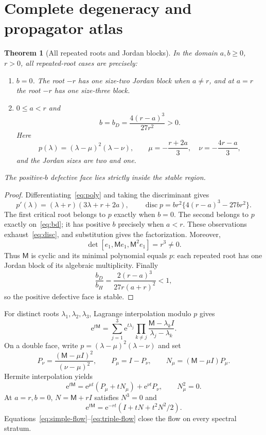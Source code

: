 \documentclass[9pt]{extarticle}
\newtheorem{theorem}{Theorem}
\newcommand{\ee}{\mathrm e}
\newcommand{\M}{\mathsf M}
\begin{document}
\section{Complete degeneracy and propagator atlas}

\begin{theorem}[All repeated roots and Jordan blocks]\label{thm:jordan}
In the domain $a,b\geq0$, $r>0$, all repeated-root cases are precisely:
\begin{enumerate}
\item $b=0$.  The root $-r$ has one size-two Jordan block when $a\ne r$,
and at $a=r$ the root $-r$ has one size-three block.
\item $0\leq a<r$ and
\begin{equation}\label{eq:bd}
 b=b_D=\frac{4(r-a)^3}{27r^2}>0.
\end{equation}
Here
\[
 p(\lambda)=(\lambda-\mu)^2(\lambda-\nu),\qquad
 \mu=-\frac{r+2a}{3},\quad \nu=-\frac{4r-a}{3},
\]
and the Jordan sizes are two and one.
\end{enumerate}
The positive-$b$ defective face lies strictly inside the stable region.
\end{theorem}

\begin{proof}
Differentiating~\eqref{eq:poly} and taking the discriminant gives
\begin{equation}\label{eq:disc}
 p'(\lambda)=(\lambda+r)(3\lambda+r+2a),\qquad
 \operatorname{disc}p=br^2\{4(r-a)^3-27br^2\}.
\end{equation}
The first critical root belongs to $p$ exactly when $b=0$.  The second
belongs to $p$ exactly on~\eqref{eq:bd}; it has positive $b$ precisely when
$a<r$.  These observations exhaust~\eqref{eq:disc}, and substitution gives
the factorization.  Moreover,
\[
 \det[e_1,\M e_1,\M^2e_1]=r^3\ne0.
\]
Thus $\M$ is cyclic and its minimal polynomial equals $p$: each repeated
root has one Jordan block of its algebraic multiplicity.  Finally
\[
 \frac{b_D}{b_H}
 =\frac{2(r-a)^3}{27r(a+r)^2}<1,
\]
so the positive defective face is stable.
\end{proof}

For distinct roots $\lambda_1,\lambda_2,\lambda_3$, Lagrange interpolation
modulo $p$ gives
\begin{equation}\label{eq:simple-flow}
 \ee^{t\M}=\sum_{j=1}^3\ee^{t\lambda_j}
 \prod_{k\ne j}\frac{\M-\lambda_kI}{\lambda_j-\lambda_k}.
\end{equation}
On a double face, write $p=(\lambda-\mu)^2(\lambda-\nu)$ and set
\[
 P_\nu=\frac{(\M-\mu I)^2}{(\nu-\mu)^2},\qquad
 P_\mu=I-P_\nu,\qquad N_\mu=(\M-\mu I)P_\mu.
\]
Hermite interpolation yields
\begin{equation}\label{eq:double-flow}
 \ee^{t\M}=\ee^{\mu t}(P_\mu+tN_\mu)+\ee^{\nu t}P_\nu,
 \qquad N_\mu^2=0.
\end{equation}
At $a=r,b=0$, $N=\M+rI$ satisfies $N^3=0$ and
\begin{equation}\label{eq:triple-flow}
 \ee^{t\M}=\ee^{-rt}(I+tN+t^2N^2/2).
\end{equation}
Equations~\eqref{eq:simple-flow}--\eqref{eq:triple-flow} close the flow on
every spectral stratum.
\end{document}
